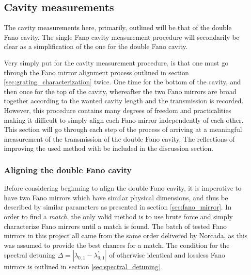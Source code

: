 \subsection{Cavity measurements}\label{sec:cavity_measurements}

The cavity measurements here, primarily, outlined will be that of the double Fano cavity. The single Fano cavity measurement procedure will secondarily be clear as a simplification of the one for the double Fano cavity. 

Very simply put for the cavity measurement procedure, is that one must go through the Fano mirror alignment process outlined in section \ref{sec:grating_characterization} twice. One time for the bottom of the cavity, and then once for the top of the cavity, whereafter the two Fano mirrors are broad together according to the wanted cavity length and the transmission is recorded. However, this procedure contains many degrees of freedom and practicalities making it difficult to simply align each Fano mirror independently of each other. This section will go through each step of the process of arriving at a meaningful measurement of the transmission of the double Fano cavity. The reflections of improving the used method with be included in the discussion section.


\subsubsection{Aligning the double Fano cavity}

Before considering beginning to align the double Fano cavity, it is imperative to have two Fano mirrors which have similar physical dimensions, and thus be described by similar parameters as presented in section \ref{sec:fano_mirror}. In order to find a \emph{match}, the only valid method is to use brute force and simply characterize Fano mirrors until a match is found. The batch of tested Fano mirrors in this project all came from the same order delivered by Norcada, as this was assumed to provide the best chances for a match. The condition for the spectral detuning $\Delta = |\lambda_{0,1} - \lambda^{\prime}_{0,1}|$ of otherwise identical and lossless Fano mirrors is outlined in section \ref{sec:spectral_detuning}.


